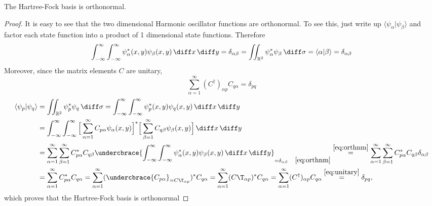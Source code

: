 \documentclass[11pt,english,a4paper]{article}
\begin{document}
\begin{prop}
The Hartree-Fock basis is orthonormal.
\end{prop}
\begin{proof}
It is easy to see that the two dimensional Harmonic oscillator functions are orthonormal. To see this, just write up $\langle \psi_{  \alpha} | \psi_{  \beta} \rangle$ and factor each state function into a product of 1 dimensional state functions. Therefore
\begin{equation}
\int_{- \infty}^\infty\int_{- \infty}^\infty \psi_\alpha^*(x,y)  \psi_\beta(x,y) \, \diff x \, \diff y = \delta_{  \alpha\beta} = \iint_{  \mathbb{R}^2} \psi_{  \alpha}^* \psi_{  \beta} \, \diff \sigma = \langle \alpha|\beta \rangle =\delta_{  \alpha \beta} \label{eq:orthnm}
\end{equation}
Moreover, since the matrix elements $C$ are unitary,
\begin{equation}
\sum_{\alpha=1}^\infty (C^\dagger)_{  \alpha p }C_{q\alpha} = \delta_{  pq} \label{eq:unitary}
\end{equation}
\begin{align*}
\langle \psi_{  p} | \psi_{  q} \rangle &= \iint_{  \mathbb{R}^2} \psi_{  p}^* \psi_{  q} \, \diff \sigma = \int_{- \infty}^\infty\int_{- \infty}^\infty \psi_{  p}^*(x,y) \psi_{  q}(x,y) \, \diff x \, \diff y \\
&= \int_{- \infty}^\infty\int_{- \infty}^\infty \Big[ \sum_{\alpha=1}^\infty C_{p\alpha} \psi_\alpha(x,y) \Big]^* \Big[ \sum_{\beta=1}^\infty C_{q\beta} \psi_\beta(x,y) \Big] \, \diff x \, \diff y \\
&= \sum_{\alpha=1}^\infty\sum_{\beta=1}^\infty C_{p\alpha}^*C_{q\beta}\undercbrace{\int_{- \infty}^\infty\int_{- \infty}^\infty \psi_\alpha^*(x,y)  \psi_\beta(x,y) \, \diff x \, \diff y}_{= \delta_{  \alpha\beta} \quad \eqref{eq:orthnm}}  \stackrel{\eqref{eq:orthnm}}{=} \sum_{\alpha=1}^\infty\sum_{\beta=1}^\infty C_{p\alpha}^*C_{q\beta}\delta_{  \alpha\beta} \\
&= \sum_{\alpha=1}^\infty C_{p\alpha}^*C_{q\alpha} 
= \sum_{\alpha=1}^\infty (\undercbrace{C_{p\alpha}}_{={C\T}_{\alpha p }})^*C_{q\alpha} = \sum_{\alpha=1}^\infty ({C\T}_{\alpha p })^*C_{q\alpha} = \sum_{\alpha=1}^\infty (C^\dagger)_{  \alpha p }C_{q\alpha} \stackrel{\eqref{eq:unitary}}{=} \delta_{  pq},
\end{align*}
which proves that the Hartree-Fock basis is orthonormal
\end{proof}
\end{document}
